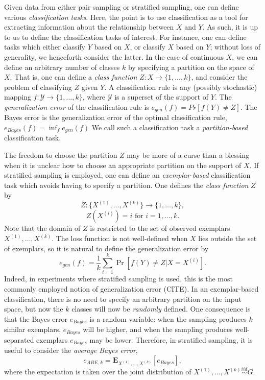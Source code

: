 \documentclass{article}
\newcommand{\E}{\textbf{E}}
\begin{document}
Given data from either pair sampling or stratified sampling, one can define various
\emph{classification tasks}.  Here, the point is to use classification as a tool for extracting information
about the relationship between $X$ and $Y$.  As such, it is up to us to define the classification tasks
of interest.  For instance, one can define tasks which either classify $Y$ based on $X$, or classify $X$ based on $Y$; without loss of generality, we henceforth consider the latter.  In the case of continuous $X$, we can define an arbitrary number of classes $k$ by specifying a partition on the space of $X$.
That is, one can define a \emph{class function} $Z: X \to \{1,\hdots, k\}$, and consider the problem of classifying $Z$ given $Y$.  A classification rule is
any (possibly stochastic) mapping $f: \mathcal{Y} \to \{1,\hdots,
k\}$, where $\mathcal{Y}$ is a superset of the support of $Y$.  The \emph{generalization error} of the classification rule is
$
e_{gen}(f) = Pr[f(Y) \neq Z].
$
The Bayes error is the generalization error of the optimal classification rule,
$
e_{Bayes}(f) = \inf_f e_{gen}(f)
$
We call such a classification task a \emph{partition-based} classification task.

The freedom to choose the partition $Z$ may be more of a curse than a blessing when it is unclear how
to choose an appropriate partition on the support of $X$.  If stratified sampling is employed,
one can define an \emph{exemplar-based} classification task which avoids having to specify a partition.  One defines the \emph{class function} $Z$ by
\[
Z: \{X^{(1)}, \hdots, X^{(k)}\} \to \{1,\hdots, k\},
\]
\[
Z(X^{(i)}) = i\text{ for }i = 1, \hdots, k.
\]
Note that the domain of $Z$ is restricted to the set of observed exemplars $X^{(1)},\hdots, X^{(k)}$.
The loss function is not well-defined when $X$ lies outside the set of exemplars,
so it is natural to define the generalization error by
\begin{equation}\label{egendef}
e_{gen}(f) = \frac{1}{k} \sum_{i=1}^k\Pr[f(Y) \neq Z|X = X^{(i)}].
\end{equation}
Indeed, in experiments where stratified sampling is used, this is the most commonly employed notion
of generalization error (CITE).
In an exemplar-based classification, there is no need to specify an arbitrary partition on the input space, but now the $k$ classes will now be \emph{randomly} defined.  One consequence is that the Bayes error $e_{Bayes}$ is a random variable: when the sampling produces $k$ similar exemplars, $e_{Bayes}$ will be higher, and when the sampling produces well-separated exemplars $e_{Bayes}$ may be lower.  
Therefore, in stratified sampling, it is useful to consider the \emph{average Bayes error},
\begin{equation}\label{abedef}
e_{ABE, k} = \E_{X^{(1)},\hdots, X^{(k)}}[e_{Bayes}],
\end{equation}
where the expectation is taken over the joint distribution of $X^{(1)},\hdots, X^{(k)} \stackrel{iid}{\sim} G$.
\end{document}
